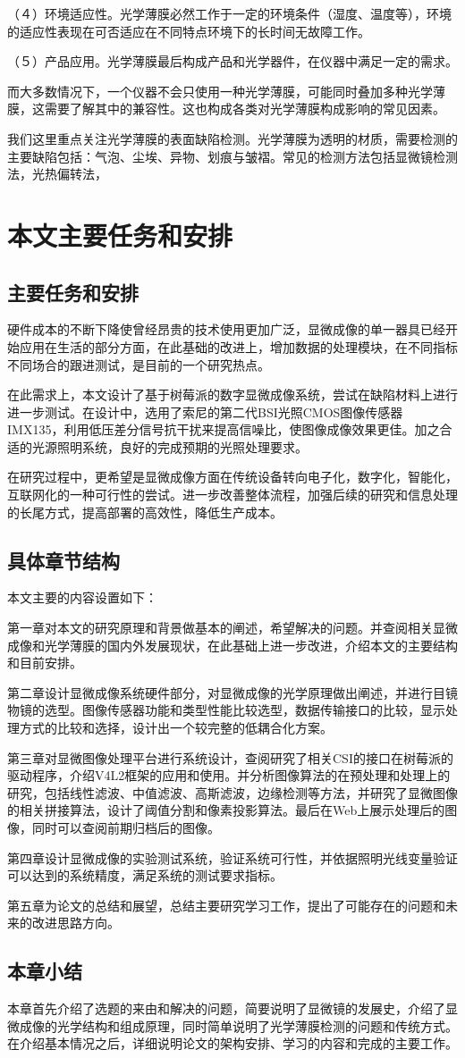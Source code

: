 （４）环境适应性。光学薄膜必然工作于一定的环境条件（湿度、温度等），环境的适应性表现在可否适应在不同特点环境下的长时间无故障工作。

（５）产品应用。光学薄膜最后构成产品和光学器件，在仪器中满足一定的需求。

而大多数情况下，一个仪器不会只使用一种光学薄膜，可能同时叠加多种光学薄膜，这需要了解其中的兼容性。这也构成各类对光学薄膜构成影响的常见因素。

我们这里重点关注光学薄膜的表面缺陷检测。光学薄膜为透明的材质，需要检测的主要缺陷包括：气泡、尘埃、异物、划痕与皱褶。常见的检测方法包括显微镜检测法，光热偏转法，

\section{本文主要任务和安排}
\subsection{主要任务和安排}
硬件成本的不断下降使曾经昂贵的技术使用更加广泛，显微成像的单一器具已经开始应用在生活的部分方面，在此基础的改进上，增加数据的处理模块，在不同指标不同场合的跟进测试，是目前的一个研究热点。

在此需求上，本文设计了基于树莓派的数字显微成像系统，尝试在缺陷材料上进行进一步测试。在设计中，选用了索尼的第二代BSI光照CMOS图像传感器IMX135，利用低压差分信号抗干扰来提高信噪比，使图像成像效果更佳。加之合适的光源照明系统，良好的完成预期的光照处理要求。

在研究过程中，更希望是显微成像方面在传统设备转向电子化，数字化，智能化，互联网化的一种可行性的尝试。进一步改善整体流程，加强后续的研究和信息处理的长尾方式，提高部署的高效性，降低生产成本。

	
\subsection{具体章节结构}

本文主要的内容设置如下：

第一章对本文的研究原理和背景做基本的阐述，希望解决的问题。并查阅相关显微成像和光学薄膜的国内外发展现状，在此基础上进一步改进，介绍本文的主要结构和目前安排。

第二章设计显微成像系统硬件部分，对显微成像的光学原理做出阐述，并进行目镜物镜的选型。图像传感器功能和类型性能比较选型，数据传输接口的比较，显示处理方式的比较和选择，设计出一个较完整的低耦合化方案。

第三章对显微图像处理平台进行系统设计，查阅研究了相关CSI的接口在树莓派的驱动程序，介绍V4L2框架的应用和使用。并分析图像算法的在预处理和处理上的研究，包括线性滤波、中值滤波、高斯滤波，边缘检测等方法，并研究了显微图像的相关拼接算法，设计了阈值分割和像素投影算法。最后在Web上展示处理后的图像，同时可以查阅前期归档后的图像。

第四章设计显微成像的实验测试系统，验证系统可行性，并依据照明光线变量验证可以达到的系统精度，满足系统的测试要求指标。

第五章为论文的总结和展望，总结主要研究学习工作，提出了可能存在的问题和未来的改进思路方向。


\subsection{本章小结}
本章首先介绍了选题的来由和解决的问题，简要说明了显微镜的发展史，介绍了显微成像的光学结构和组成原理，同时简单说明了光学薄膜检测的问题和传统方式。在介绍基本情况之后，详细说明论文的架构安排、学习的内容和完成的主要工作。
